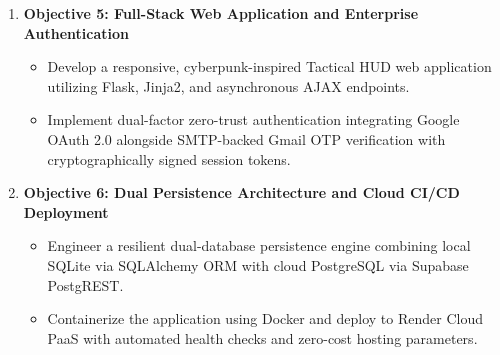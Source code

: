 \begin{enumerate}
    \item \textbf{Objective 5: Full-Stack Web Application and Enterprise Authentication}
    \begin{itemize}
        \item Develop a responsive, cyberpunk-inspired Tactical HUD web application utilizing Flask, Jinja2, and asynchronous AJAX endpoints.
        \item Implement dual-factor zero-trust authentication integrating Google OAuth 2.0 alongside SMTP-backed Gmail OTP verification with cryptographically signed session tokens.
    \end{itemize}

    \item \textbf{Objective 6: Dual Persistence Architecture and Cloud CI/CD Deployment}
    \begin{itemize}
        \item Engineer a resilient dual-database persistence engine combining local SQLite via SQLAlchemy ORM with cloud PostgreSQL via Supabase PostgREST.
        \item Containerize the application using Docker and deploy to Render Cloud PaaS with automated health checks and zero-cost hosting parameters.
    \end{itemize}
\end{enumerate}
